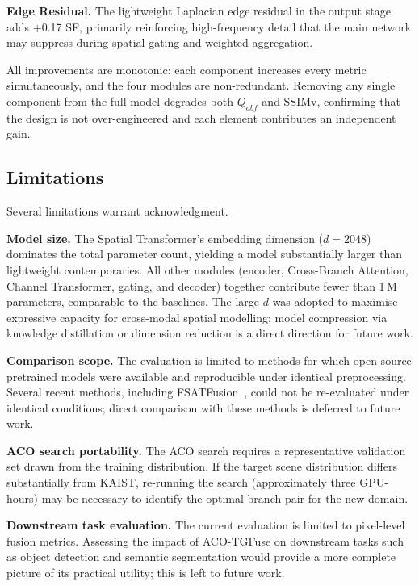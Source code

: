 \documentclass[a4paper,fleqn]{cas-dc}
\begin{document}
\textbf{Edge Residual.}
The lightweight Laplacian edge residual in the output stage adds +0.17 SF,
primarily reinforcing high-frequency detail that the main network may
suppress during spatial gating and weighted aggregation.

All improvements are monotonic: each component increases every metric
simultaneously, and the four modules are non-redundant.  Removing any single
component from the full model degrades both $Q_{abf}$ and SSIMv, confirming
that the design is not over-engineered and each element contributes an
independent gain.

\subsection{Limitations}
\label{sec:exp:limits}

Several limitations warrant acknowledgment.

\textbf{Model size.}
The Spatial Transformer's embedding dimension ($d=2048$) dominates the
total parameter count, yielding a model substantially larger than
lightweight contemporaries.  All other modules (encoder, Cross-Branch
Attention, Channel Transformer, gating, and decoder) together contribute
fewer than 1\,M parameters, comparable to the baselines.  The large
$d$ was adopted to maximise expressive capacity for cross-modal spatial
modelling; model compression via knowledge distillation or dimension
reduction is a direct direction for future work.

\textbf{Comparison scope.}
The evaluation is limited to methods for which open-source pretrained
models were available and reproducible under identical preprocessing.
Several recent methods, including FSATFusion~\cite{fsatfusion2026}, could
not be re-evaluated under identical conditions; direct comparison with
these methods is deferred to future work.

\textbf{ACO search portability.}
The ACO search requires a representative validation set drawn from the
training distribution.  If the target scene distribution differs
substantially from KAIST, re-running the search (approximately three
GPU-hours) may be necessary to identify the optimal branch pair for
the new domain.

\textbf{Downstream task evaluation.}
The current evaluation is limited to pixel-level fusion metrics.
Assessing the impact of ACO-TGFuse on downstream tasks such as
object detection and semantic segmentation would provide a more complete
picture of its practical utility; this is left to future work.
\end{document}

